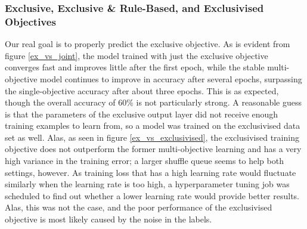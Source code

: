 \subsubsection{Exclusive, Exclusive \& Rule-Based, and Exclusivised Objectives}

Our real goal is to properly predict the exclusive objective.
As is evident from figure \ref{ex_vs_joint}, the model trained with just the exclusive objective converges fast and improves little after the first epoch, while the stable multi-objective model continues to improve in accuracy after several epochs, surpassing the single-objective accuracy after about three epochs.
This is as expected, though the overall accuracy of 60\% is not particularly strong.
A reasonable guess is that the parameters of the exclusive output layer did not receive enough training examples to learn from, so a model was trained on the exclusivised data set as well.
Alas, as seen in figure \ref{ex_vs_exclusivised}, the exclusivised training objective does not outperform the former multi-objective learning and has a very high variance in the training error; a larger shuffle queue seems to help both settings, however.
As training loss that has a high learning rate would fluctuate similarly when the learning rate is too high, a hyperparameter tuning job was scheduled to find out whether a lower learning rate would provide better results.
Alas, this was not the case, and the poor performance of the exclusivised objective is most likely caused by the noise in the labels.

